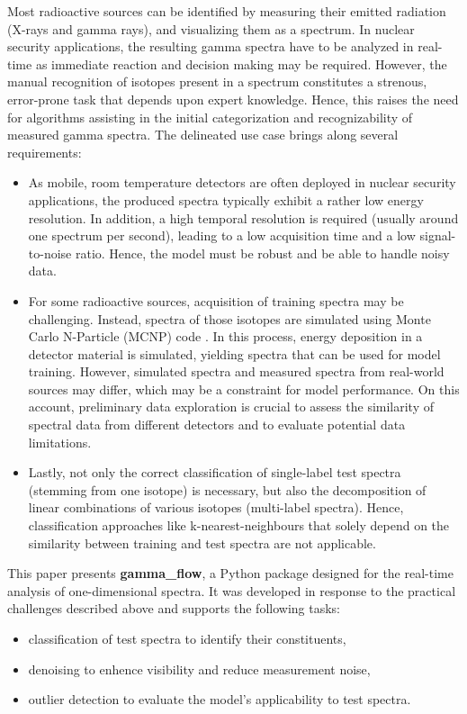 \documentclass[preprint,12pt, a4paper]{elsarticle}
\begin{document}
Most radioactive sources can be identified by measuring their emitted radiation (X-rays and gamma rays), and visualizing them as a spectrum. In nuclear security applications, the resulting gamma spectra have to be analyzed in real-time as immediate reaction and decision making may be required. 
However, the manual recognition of isotopes present in a spectrum constitutes a 
strenous, error-prone task that depends upon expert knowledge. Hence, this raises 
the need for algorithms assisting in the initial categorization and recognizability 
of measured gamma spectra. 
The delineated use case brings along several requirements:  
\begin{itemize}
\item As mobile, room temperature detectors are often deployed in nuclear security applications, the produced spectra typically exhibit a rather low energy resolution. In addition, a high temporal resolution is required (usually around one spectrum per second), leading to a low acquisition time and a low signal-to-noise ratio. Hence, the model must be robust and be able to handle noisy data.  
\item For some radioactive sources, acquisition of training spectra may be challenging. Instead, spectra of those isotopes are simulated using Monte Carlo N-Particle (MCNP) code \cite{Kulesza2022}. In this process, energy deposition in a detector material is simulated, yielding spectra that can be used for model training. However, simulated spectra and measured spectra from real-world sources may differ, which may be a constraint for model performance. On this account, preliminary data exploration is crucial to assess the similarity of spectral data from different detectors and to evaluate potential data limitations.  
\item Lastly, not only the correct classification of single-label test spectra (stemming from one isotope) is necessary, but also the decomposition of linear combinations of various isotopes (multi-label spectra). Hence, classification approaches like k-nearest-neighbours that solely depend on the similarity between training and test spectra are not applicable.  
\end{itemize} 
This paper presents \textbf{gamma\_flow}, a Python package designed for the real-time analysis of one-dimensional spectra. It was developed in response to the practical challenges described above and supports the following tasks:
\begin{itemize}
\item classification of test spectra to identify their constituents,  
\item denoising to enhence visibility and reduce measurement noise,
\item outlier detection to evaluate the model's applicability to test spectra.   
\end{itemize}
\end{document}
